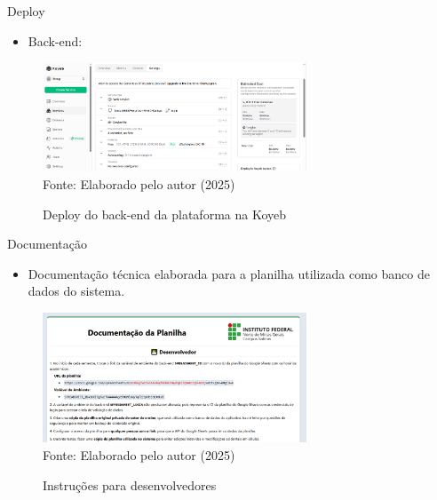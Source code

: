\begin{frame}{Deploy}
    \begin{itemize}
		\item Back-end:
	\end{itemize}
    \begin{figure}
        \centering
        \vspace{-0.3cm}
        \caption{Deploy do back-end da plataforma na Koyeb}
        \vspace{-0.2cm}
        \includegraphics[width=0.7\textwidth]{figuras/deploy-2.png}
        \\ %
        \small Fonte: Elaborado pelo autor (2025)
    \end{figure}
\end{frame}

\begin{frame}{Documentação}
    \begin{itemize}
		\item Documentação técnica elaborada para a planilha utilizada como banco de dados do sistema.
	\end{itemize}
    \begin{figure}
        \centering
        \vspace{-0.3cm}
        \caption{Instruções para desenvolvedores}
        \vspace{-0.2cm}
        \includegraphics[width=0.7\textwidth]{figuras/doc-1.png}
        \\ %
        \small Fonte: Elaborado pelo autor (2025)
    \end{figure}
\end{frame}

